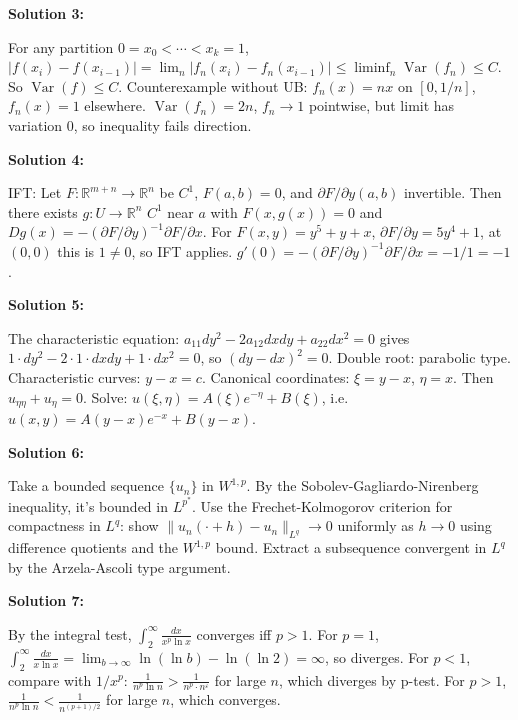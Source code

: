 \documentclass[12pt,a4paper]{exam}
\begin{document}
\vspace{0.5cm}

\textbf{Solution 3:}

For any partition $0 = x_0 < \cdots < x_k = 1$, $|f(x_i) - f(x_{i-1})| = \lim_n |f_n(x_i) - f_n(x_{i-1})| \leq \liminf_n \operatorname{Var}(f_n) \leq C$. So $\operatorname{Var}(f) \leq C$. Counterexample without UB: $f_n(x) = n x$ on $[0,1/n]$, $f_n(x)=1$ elsewhere. $\operatorname{Var}(f_n) = 2n$, $f_n \to 1$ pointwise, but limit has variation 0, so inequality fails direction.

\vspace{0.5cm}

\textbf{Solution 4:}

IFT: Let $F: \mathbb{R}^{m+n} \to \mathbb{R}^n$ be $C^1$, $F(a,b)=0$, and $\partial F/\partial y (a,b)$ invertible. Then there exists $g: U \to \mathbb{R}^n$ $C^1$ near $a$ with $F(x,g(x))=0$ and $Dg(x) = -(\partial F/\partial y)^{-1} \partial F/\partial x$. For $F(x,y) = y^5 + y + x$, $\partial F/\partial y = 5y^4 + 1$, at $(0,0)$ this is $1 \neq 0$, so IFT applies. $g'(0) = - (\partial F/\partial y)^{-1} \partial F/\partial x = -1/1 = -1$.

\vspace{0.5cm}

\textbf{Solution 5:}

The characteristic equation: $a_{11} dy^2 - 2a_{12} dx dy + a_{22} dx^2 = 0$ gives $1\cdot dy^2 - 2\cdot1\cdot dx dy + 1\cdot dx^2 = 0$, so $(dy - dx)^2 = 0$. Double root: parabolic type. Characteristic curves: $y - x = c$. Canonical coordinates: $\xi = y - x$, $\eta = x$. Then $u_{\eta\eta} + u_\eta = 0$. Solve: $u(\xi,\eta) = A(\xi) e^{-\eta} + B(\xi)$, i.e. $u(x,y) = A(y-x) e^{-x} + B(y-x)$.

\vspace{0.5cm}

\textbf{Solution 6:}

Take a bounded sequence $\{u_n\}$ in $W^{1,p}$. By the Sobolev-Gagliardo-Nirenberg inequality, it's bounded in $L^{p^*}$. Use the Frechet-Kolmogorov criterion for compactness in $L^q$: show $\|u_n(\cdot + h) - u_n\|_{L^q} \to 0$ uniformly as $h \to 0$ using difference quotients and the $W^{1,p}$ bound. Extract a subsequence convergent in $L^q$ by the Arzela-Ascoli type argument.

\vspace{0.5cm}

\textbf{Solution 7:}

By the integral test, $\int_2^{\infty} \frac{dx}{x^p \ln x}$ converges iff $p > 1$. For $p=1$, $\int_2^{\infty} \frac{dx}{x \ln x} = \lim_{b \to \infty} \ln(\ln b) - \ln(\ln 2) = \infty$, so diverges. For $p<1$, compare with $1/x^p$: $\frac{1}{n^p \ln n} > \frac{1}{n^p \cdot n^{\varepsilon}}$ for large $n$, which diverges by p-test. For $p>1$, $\frac{1}{n^p \ln n} < \frac{1}{n^{(p+1)/2}}$ for large $n$, which converges.
\end{document}
